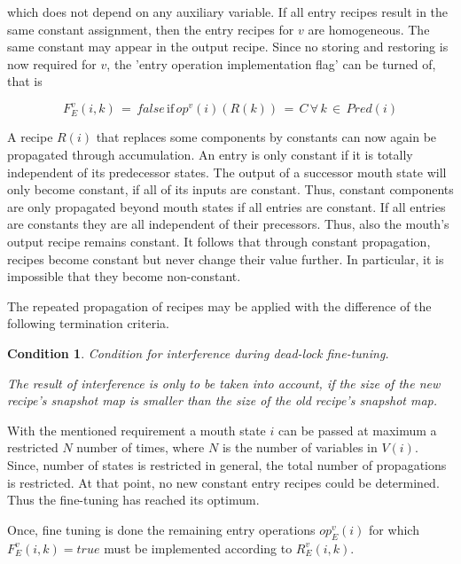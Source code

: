 \documentclass[12pt,a4paper]{scrartcl}
\newtheorem{condition}{Condition}
\begin{document}
which does not depend on any auxiliary variable. If all entry recipes result in
the same constant assignment, then the entry recipes for $v$ are homogeneous.
The same constant may appear in the output recipe. Since no storing and restoring
is now required for $v$, the 'entry operation implementation flag' can be turned
of, that is

\begin{equation}
    F_E^v(i,k)\,=\,false\,\mbox{if}\,op^v(i)(R(k))\,=\,C\,\forall\,k\,\in\,Pred(i)
\end{equation}

A recipe $R(i)$ that replaces some components by constants can now again be
propagated through accumulation. An entry is only constant if it is totally
independent of its predecessor states. The output of a successor mouth state
will only become constant, if all of its inputs are constant. Thus, constant
components are only propagated beyond mouth states if all entries are constant.
If all entries are constants they are all independent of their precessors.
Thus, also the mouth's output recipe remains constant. It follows that through
constant propagation, recipes become constant but never change their value
further.  In particular, it is impossible that they become non-constant.

The repeated propagation of recipes may be applied with the difference of the
following termination criteria.

\begin{condition}
Condition for interference during dead-lock fine-tuning.

The result of interference is only to be taken into account, if the size of the
new recipe's snapshot map is smaller than the size of the old recipe's snapshot
map.  
\end{condition}

With the mentioned requirement a mouth state $i$ can be passed at maximum a
restricted $N$ number of times, where $N$ is the number of variables in
$V(i)$. Since, number of states is restricted in general, the total number of
propagations is restricted. At that point, no new constant entry recipes could
be determined. Thus the fine-tuning has reached its optimum.

Once, fine tuning is done the remaining entry operations $op_E^v(i)$ for which
$F_E^v(i,k)=true$ must be implemented according to $R_E^v(i,k)$.
\end{document}
